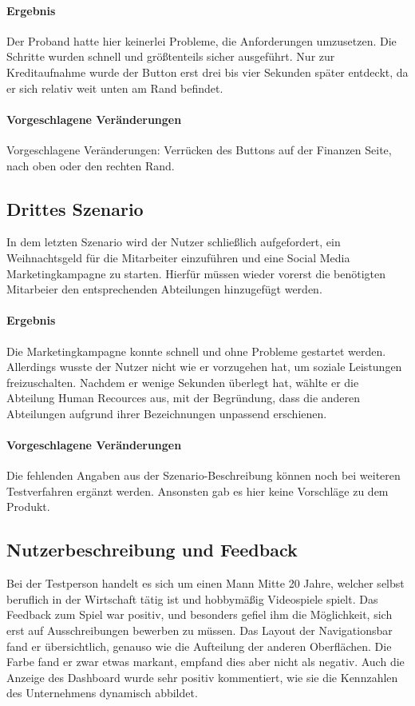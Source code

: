 \paragraph{Ergebnis}
Der Proband hatte hier keinerlei Probleme, die Anforderungen umzusetzen. Die Schritte wurden schnell und größtenteils sicher ausgeführt. Nur zur Kreditaufnahme wurde der Button erst drei bis vier Sekunden später entdeckt, da er sich relativ weit unten am Rand befindet.

\paragraph{ Vorgeschlagene Veränderungen }
Vorgeschlagene Veränderungen: Verrücken des Buttons auf der Finanzen Seite, nach oben oder den rechten Rand.

\subsection{Drittes Szenario}
In dem letzten Szenario wird der Nutzer schließlich aufgefordert, ein Weihnachtsgeld für die Mitarbeiter einzuführen und eine Social Media Marketingkampagne zu starten. Hierfür müssen wieder vorerst die benötigten Mitarbeier den entsprechenden Abteilungen hinzugefügt werden.

\paragraph{Ergebnis}
Die Marketingkampagne konnte schnell und ohne Probleme gestartet werden. Allerdings wusste der Nutzer nicht wie er vorzugehen hat, um soziale Leistungen freizuschalten. Nachdem er wenige Sekunden überlegt hat, wählte er die Abteilung Human Recources aus, mit der Begründung, dass die anderen Abteilungen aufgrund ihrer Bezeichnungen unpassend erschienen.

\paragraph{ Vorgeschlagene Veränderungen }
Die fehlenden Angaben aus der Szenario-Beschreibung können noch bei weiteren Testverfahren ergänzt werden. Ansonsten gab es hier keine Vorschläge zu dem Produkt.

\subsection{Nutzerbeschreibung und Feedback}
Bei der Testperson handelt es sich um einen Mann Mitte 20 Jahre, welcher selbst beruflich in der Wirtschaft tätig ist und hobbymäßig Videospiele spielt.
Das Feedback zum Spiel war positiv, und besonders gefiel ihm die Möglichkeit, sich erst auf Ausschreibungen bewerben zu müssen. Das Layout der Navigationsbar fand er übersichtlich, genauso wie die Aufteilung der anderen Oberflächen. Die Farbe fand er zwar etwas markant, empfand dies aber nicht als negativ.
Auch die Anzeige des Dashboard wurde sehr positiv kommentiert, wie sie die Kennzahlen des Unternehmens dynamisch abbildet.
